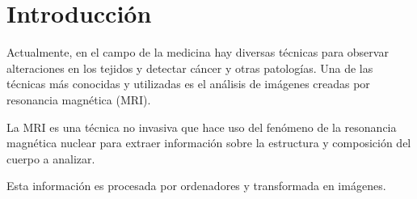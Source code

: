 





\section{Introducción}
Actualmente, en el campo de la medicina hay diversas técnicas para observar alteraciones en los tejidos y detectar cáncer y otras patologías. Una de las técnicas más conocidas y utilizadas es el análisis de imágenes creadas por resonancia magnética (MRI). 

La MRI es una técnica no invasiva que hace uso del fenómeno de la resonancia magnética nuclear para extraer información sobre la estructura y composición del cuerpo a analizar.

Esta información es procesada por ordenadores y transformada en imágenes.


